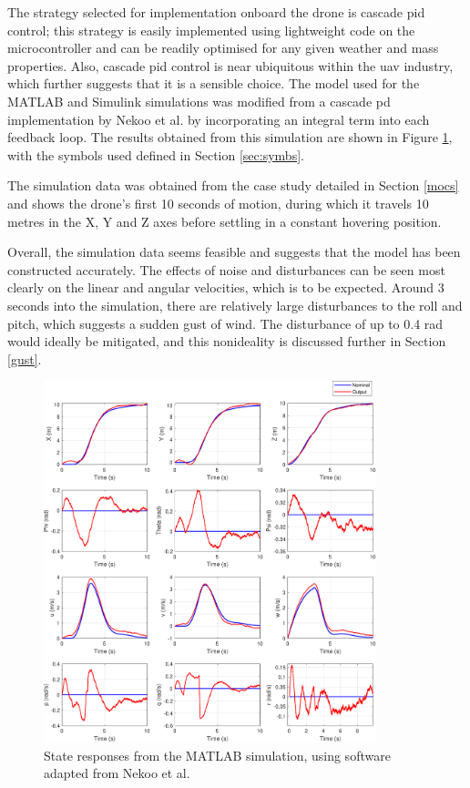 The strategy selected for implementation onboard the drone is cascade \gls{pid} control; this strategy is easily implemented using lightweight code on the microcontroller and can be readily optimised for any given weather and mass properties. Also, cascade \gls{pid} control is near ubiquitous within the \gls{uav} industry, which further suggests that it is a sensible choice. The model used for the MATLAB and Simulink simulations was modified from a cascade \gls{pd} implementation by Nekoo et al. \cite{nekoo} by incorporating an integral term into each feedback loop. The results obtained from this simulation are shown in Figure \ref{fig:12sims}, with the symbols used defined in Section \ref{sec:symbs}. 

The simulation data was obtained from the case study detailed in Section \ref{mocs} and shows the drone's first 10 seconds of motion, during which it travels 10 metres in the X, Y and Z axes before settling in a constant hovering position. 

Overall, the simulation data seems feasible and suggests that the model has been constructed accurately. The effects of noise and disturbances can be seen most clearly on the linear and angular velocities, which is to be expected. Around 3 seconds into the simulation, there are relatively large disturbances to the roll and pitch, which suggests a sudden gust of wind. The disturbance of up to 0.4 rad would ideally be mitigated, and this nonideality is discussed further in Section \ref{gust}. 



\begin{figure}[H]
\centering
\includegraphics[width=0.86\textwidth]{figs/Samuel/Figures/twelveplotsvectorgraphic.pdf}
\caption[State Responses from the MATLAB Simulation]{State responses from the MATLAB simulation, using software adapted from Nekoo et al. \cite{nekoo}}
\label{fig:12sims}
\end{figure}










